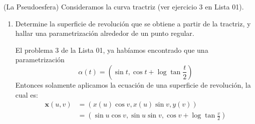 \begin{problema} (La Pseudoesfera) Consideramos la curva tractriz (ver ejercicio 3 en Lista 01).

    \begin{enumerate}
        \item Determine la superficie de revolución que se obtiene a partir de la tractriz, y hallar una parametrización alrededor de un punto regular.
        \begin{sol}
            El problema 3 de la Lista 01, ya habíamos encontrado que una parametrización $$\alpha(t)= \left(\sin t,\cos t+\log \tan \frac{t}{2}\right)$$
            Entonces solamente aplicamos la ecuación de una superficie de revolución, la cual es:
            \begin{align*}
                \mathbf{x}(u,v)&=\left(x(u)\cos v, x(u)\sin v, y(v)\right)\\
                &= \left(\sin u\cos v, \sin u \sin v, \cos v+\log \tan \frac{v}{2}\right)
            \end{align*}
            

\end{sol}
\end{enumerate}
\end{problema}
